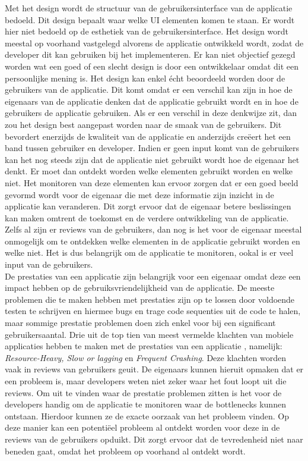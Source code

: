 Met het design wordt de structuur van de gebruikersinterface van de applicatie bedoeld. Dit design bepaalt waar welke UI elementen komen te staan. Er wordt hier niet bedoeld op de esthetiek van de gebruikersinterface.
Het design wordt meestal op voorhand vastgelegd alvorens de applicatie ontwikkeld wordt, zodat de developer dit kan gebruiken bij het implementeren. Er kan niet objectief gezegd worden wat een goed of een slecht design is door een ontwikkelaar omdat dit een persoonlijke mening is. Het design kan enkel \'echt beoordeeld worden door de gebruikers van de applicatie. Dit komt omdat er een verschil kan zijn in hoe de eigenaars van de applicatie denken dat de applicatie gebruikt wordt en in hoe de gebruikers de applicatie gebruiken. Als er een verschil in deze denkwijze zit, dan zou het design best aangepast worden naar de smaak van de gebruikers. Dit bevordert enerzijds de kwaliteit van de applicatie en anderzijds cre\"eert het een band tussen gebruiker en developer. Indien er geen input komt van de gebruikers kan het nog steeds zijn dat de applicatie niet gebruikt wordt hoe de eigenaar het denkt. Er moet dan ontdekt worden welke elementen gebruikt worden en welke niet. Het monitoren van deze elementen kan ervoor zorgen dat er een goed beeld gevormd wordt voor de eigenaar die met deze informatie zijn inzicht in de applicatie kan veranderen. Dit zorgt ervoor dat de eigenaar betere beslissingen kan maken omtrent de toekomst en de verdere ontwikkeling van de applicatie. Zelfs al zijn er reviews van de gebruikers, dan nog is het voor de eigenaar meestal onmogelijk om te ontdekken welke elementen in de applicatie gebruikt worden en welke niet. Het is dus belangrijk om de applicatie te monitoren, ookal is er veel input van de gebruikers. \\


De prestaties van een applicatie zijn belangrijk voor een eigenaar omdat deze een impact hebben op de gebruiksvriendelijkheid van de applicatie. De meeste problemen die te maken hebben met prestaties zijn op te lossen door voldoende testen te schrijven en hiermee bugs en trage code sequenties uit de code te halen, maar sommige prestatie problemen doen zich enkel voor bij een significant gebruikersaantal. Drie uit de top tien van meest vermelde klachten van mobiele applicaties hebben te maken met de prestaties van een applicatie \cite{AppSucks}, namelijk: \textit{Resource-Heavy, Slow or lagging} en \textit{Frequent Crashing}. Deze klachten worden vaak in reviews van gebruikers geuit. De eigenaars kunnen hieruit opmaken dat er een probleem is, maar developers weten niet zeker waar het fout loopt uit die reviews. Om uit te vinden waar de prestatie problemen zitten is het voor de developers handig om de applicatie te monitoren waar de bottlenecks kunnen ontstaan. Hierdoor kunnen ze de exacte oorzaak van het probleem vinden. Op deze manier kan een potenti\"eel probleem al ontdekt worden voor deze in de reviews van de gebruikers opduikt. Dit zorgt ervoor dat de tevredenheid niet naar beneden gaat, omdat het probleem op voorhand al ontdekt wordt. \\



